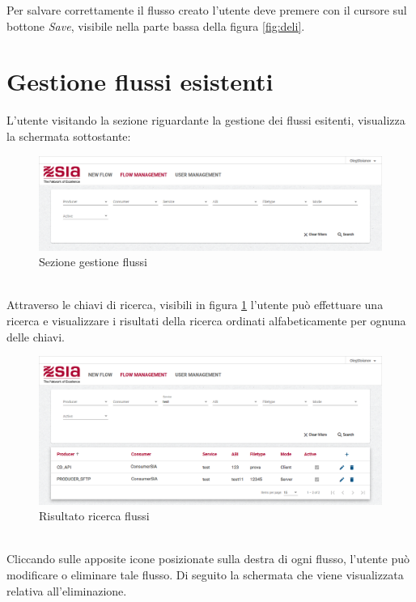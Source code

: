 Per salvare correttamente il flusso creato l'utente deve premere con il cursore sul bottone \textit{Save}, visibile nella parte bassa della figura \ref{fig:deli}.

\clearpage
\section{Gestione flussi esistenti}
 L'utente visitando la sezione riguardante la gestione dei flussi esitenti, visualizza la schermata sottostante: 
 

\begin{figure}
\begin{center}
\includegraphics[width=1.0\columnwidth]{images/flow.png}
\end{center}
\caption{Sezione gestione flussi}
\label{fig:flow}
\end{figure}
\ \\
Attraverso le chiavi di ricerca, visibili in figura \ref{fig:flow} l'utente può effettuare una ricerca e visualizzare i risultati della ricerca ordinati alfabeticamente per ognuna delle chiavi.

\begin{figure}
\begin{center}
\includegraphics[width=1.0\columnwidth]{images/ricerca.png}
\end{center}
\caption{Risultato ricerca flussi}
\label{fig:ricerca}
\end{figure}

\clearpage
\ \\
Cliccando sulle apposite icone posizionate sulla destra di ogni flusso, l'utente può modificare o eliminare tale flusso. Di seguito la schermata che viene visualizzata relativa all'eliminazione.

